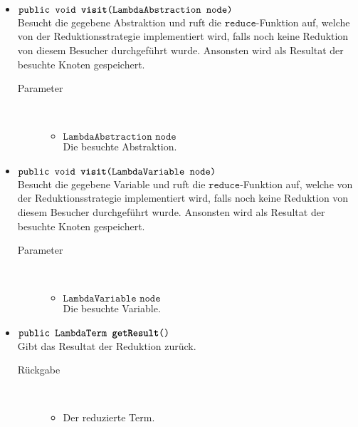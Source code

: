 \begin{description}
\begin{itemize}
		\item $\texttt{public void \textbf{visit}(LambdaAbstraction node)}$ \\ Besucht die gegebene Abstraktion und ruft die $\texttt{reduce}$-Funktion auf, welche von der Reduktionsstrategie implementiert wird, falls noch keine Reduktion von diesem Besucher durchgeführt wurde. Ansonsten wird als Resultat der besuchte Knoten gespeichert.
		\begin{description}
			\item[Parameter] \hfill \\
			\vspace{-.8cm}
			\begin{itemize}
				\item $\texttt{LambdaAbstraction node}$ \\ Die besuchte Abstraktion.
			\end{itemize}
		\end{description}
		
		\item $\texttt{public void \textbf{visit}(LambdaVariable node)}$ \\ Besucht die gegebene Variable und ruft die $\texttt{reduce}$-Funktion auf, welche von der Reduktionsstrategie implementiert wird, falls noch keine Reduktion von diesem Besucher durchgeführt wurde. Ansonsten wird als Resultat der besuchte Knoten gespeichert.
		\begin{description}
			\item[Parameter] \hfill \\
			\vspace{-.8cm}
			\begin{itemize}
				\item $\texttt{LambdaVariable node}$ \\ Die besuchte Variable.
			\end{itemize}
		\end{description}
		
		\item $\texttt{public LambdaTerm \textbf{getResult}()}$ \\ Gibt das Resultat der Reduktion zurück.
		\begin{description}
			\item[Rückgabe] \hfill \\
			\vspace{-.8cm}
			\begin{itemize}
				\item Der reduzierte Term.
			\end{itemize}
		\end{description}
		

\end{itemize}
\end{description}

